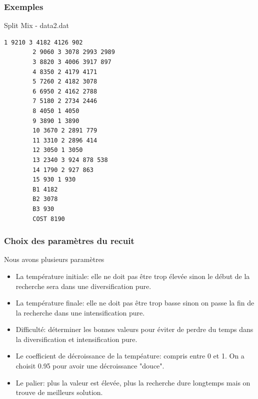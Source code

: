 \documentclass{beamer}
\begin{document}
\begin{frame}[fragile]
    \frametitle{Exemples}
    \begin{exampleblock}{Split Mix - data2.dat}
        \begin{lstlisting}[basicstyle=\tiny]
        1 9210 3 4182 4126 902 
        2 9060 3 3078 2993 2989 
        3 8820 3 4006 3917 897 
        4 8350 2 4179 4171 
        5 7260 2 4182 3078 
        6 6950 2 4162 2788 
        7 5180 2 2734 2446 
        8 4050 1 4050 
        9 3890 1 3890 
        10 3670 2 2891 779 
        11 3310 2 2896 414 
        12 3050 1 3050 
        13 2340 3 924 878 538 
        14 1790 2 927 863 
        15 930 1 930 
        B1 4182
        B2 3078
        B3 930
        COST 8190
        \end{lstlisting}
    \end{exampleblock}
\end{frame}

\begin{frame}
    \frametitle{Choix des paramètres du recuit}
    Nous avons plusieurs paramètres
    \begin{itemize}
    \item La température initiale: elle ne doit pas être trop élevée sinon le début de la recherche sera dans une diversification pure.
    \item La température finale: elle ne doit pas être trop basse sinon on passe la fin de la recherche dans une intensification pure.
    \item Difficulté: déterminer les bonnes valeurs pour éviter de perdre du temps dans la diversification et intensification pure.
    \item Le coefficient de décroissance de la tempéature: compris entre 0 et 1. On a choisit 0.95 pour avoir une décroissance "douce".
    \item Le palier: plus la valeur est élevée, plus la recherche dure longtemps mais on trouve de meilleurs solution.
    \end{itemize}

\end{frame}
\end{document}
